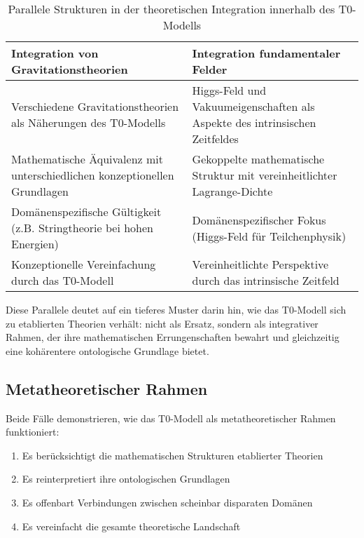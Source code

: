 \documentclass[12pt,a4paper]{article}
\begin{document}
	\begin{table}[h]
		\centering
		\begin{tabular}{|p{}|p{}|}
			\hline
			\textbf{Integration von Gravitationstheorien} & \textbf{Integration fundamentaler Felder} \\
			\hline
			Verschiedene Gravitationstheorien als Näherungen des T0-Modells & Higgs-Feld und Vakuumeigenschaften als Aspekte des intrinsischen Zeitfeldes \\
			\hline
			Mathematische Äquivalenz mit unterschiedlichen konzeptionellen Grundlagen & Gekoppelte mathematische Struktur mit vereinheitlichter Lagrange-Dichte \\
			\hline
			Domänenspezifische Gültigkeit (z.B. Stringtheorie bei hohen Energien) & Domänenspezifischer Fokus (Higgs-Feld für Teilchenphysik) \\
			\hline
			Konzeptionelle Vereinfachung durch das T0-Modell & Vereinheitlichte Perspektive durch das intrinsische Zeitfeld \\
			\hline
		\end{tabular}
		\caption{Parallele Strukturen in der theoretischen Integration innerhalb des T0-Modells}
		\label{tab:parallel_structures}
	\end{table}
	
	Diese Parallele deutet auf ein tieferes Muster darin hin, wie das T0-Modell sich zu etablierten Theorien verhält: nicht als Ersatz, sondern als integrativer Rahmen, der ihre mathematischen Errungenschaften bewahrt und gleichzeitig eine kohärentere ontologische Grundlage bietet.
	
	\subsection{Metatheoretischer Rahmen}
	\label{subsec:metatheory}
	
	Beide Fälle demonstrieren, wie das T0-Modell als metatheoretischer Rahmen funktioniert:
	
	\begin{enumerate}
		\item Es berücksichtigt die mathematischen Strukturen etablierter Theorien
		\item Es reinterpretiert ihre ontologischen Grundlagen
		\item Es offenbart Verbindungen zwischen scheinbar disparaten Domänen
		\item Es vereinfacht die gesamte theoretische Landschaft
	\end{enumerate}
	
\end{document}
